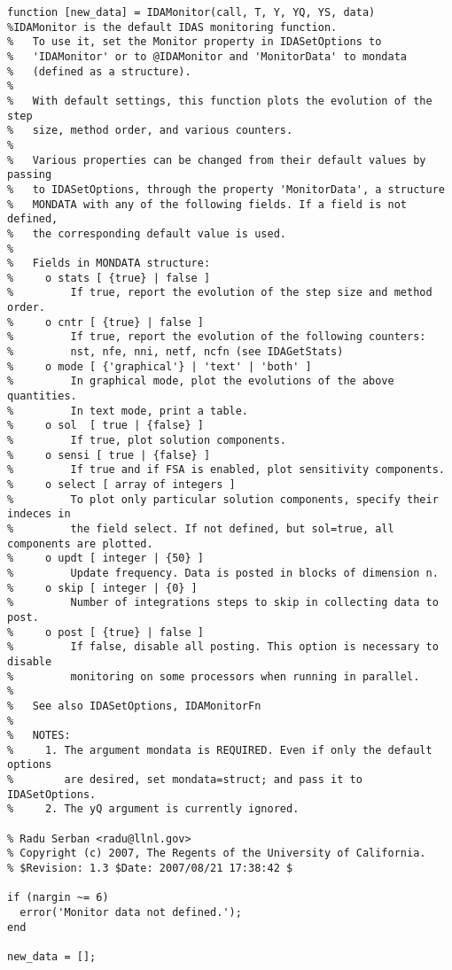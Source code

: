 \begin{lstlisting}[linerange={1-1,45-797}]
function [new_data] = IDAMonitor(call, T, Y, YQ, YS, data)
%IDAMonitor is the default IDAS monitoring function.
%   To use it, set the Monitor property in IDASetOptions to
%   'IDAMonitor' or to @IDAMonitor and 'MonitorData' to mondata
%   (defined as a structure).
%  
%   With default settings, this function plots the evolution of the step 
%   size, method order, and various counters.
%   
%   Various properties can be changed from their default values by passing
%   to IDASetOptions, through the property 'MonitorData', a structure
%   MONDATA with any of the following fields. If a field is not defined, 
%   the corresponding default value is used.
%
%   Fields in MONDATA structure:
%     o stats [ {true} | false ]
%         If true, report the evolution of the step size and method order.
%     o cntr [ {true} | false ]
%         If true, report the evolution of the following counters:
%         nst, nfe, nni, netf, ncfn (see IDAGetStats)
%     o mode [ {'graphical'} | 'text' | 'both' ] 
%         In graphical mode, plot the evolutions of the above quantities.
%         In text mode, print a table.
%     o sol  [ true | {false} ]
%         If true, plot solution components.
%     o sensi [ true | {false} ]
%         If true and if FSA is enabled, plot sensitivity components.
%     o select [ array of integers ]
%         To plot only particular solution components, specify their indeces in
%         the field select. If not defined, but sol=true, all components are plotted.
%     o updt [ integer | {50} ]
%         Update frequency. Data is posted in blocks of dimension n.
%     o skip [ integer | {0} ]
%         Number of integrations steps to skip in collecting data to post.
%     o post [ {true} | false ]
%         If false, disable all posting. This option is necessary to disable
%         monitoring on some processors when running in parallel.
%
%   See also IDASetOptions, IDAMonitorFn
%
%   NOTES:
%     1. The argument mondata is REQUIRED. Even if only the default options
%        are desired, set mondata=struct; and pass it to IDASetOptions.
%     2. The yQ argument is currently ignored.     

% Radu Serban <radu@llnl.gov>
% Copyright (c) 2007, The Regents of the University of California.
% $Revision: 1.3 $Date: 2007/08/21 17:38:42 $

if (nargin ~= 6) 
  error('Monitor data not defined.');
end

new_data = [];


\end{lstlisting}
